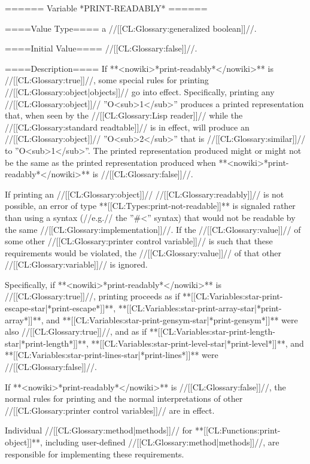 ====== Variable *PRINT-READABLY* ======

====Value Type====
a //[[CL:Glossary:generalized boolean]]//.

====Initial Value====
//[[CL:Glossary:false]]//.

====Description====
If **<nowiki>*print-readably*</nowiki>** is //[[CL:Glossary:true]]//, some special rules for printing //[[CL:Glossary:object|objects]]// go into effect. Specifically, printing any //[[CL:Glossary:object]]// ''O<sub>1</sub>'' produces a printed representation that, when seen by the //[[CL:Glossary:Lisp reader]]// while the //[[CL:Glossary:standard readtable]]// is in effect, will produce an //[[CL:Glossary:object]]// ''O<sub>2</sub>'' that is //[[CL:Glossary:similar]]// to ''O<sub>1</sub>''. The printed representation produced might or might not be the same as the printed representation produced when **<nowiki>*print-readably*</nowiki>** is //[[CL:Glossary:false]]//.

If printing an //[[CL:Glossary:object]]// //[[CL:Glossary:readably]]// is not possible, an error of type **[[CL:Types:print-not-readable]]** is signaled rather than using a syntax (//e.g.// the ''#<'' syntax) that would not be readable by the same //[[CL:Glossary:implementation]]//. If the //[[CL:Glossary:value]]// of some other //[[CL:Glossary:printer control variable]]// is such that these requirements would be violated, the //[[CL:Glossary:value]]// of that other //[[CL:Glossary:variable]]// is ignored.

Specifically, if **<nowiki>*print-readably*</nowiki>** is //[[CL:Glossary:true]]//, printing proceeds as if **[[CL:Variables:star-print-escape-star|*print-escape*]]**, **[[CL:Variables:star-print-array-star|*print-array*]]**, and **[[CL:Variables:star-print-gensym-star|*print-gensym*]]** were also //[[CL:Glossary:true]]//, and as if **[[CL:Variables:star-print-length-star|*print-length*]]**, **[[CL:Variables:star-print-level-star|*print-level*]]**, and **[[CL:Variables:star-print-lines-star|*print-lines*]]** were //[[CL:Glossary:false]]//.

If **<nowiki>*print-readably*</nowiki>** is //[[CL:Glossary:false]]//, the normal rules for printing and the normal interpretations of other //[[CL:Glossary:printer control variables]]// are in effect.

Individual //[[CL:Glossary:method|methods]]// for **[[CL:Functions:print-object]]**, including user-defined //[[CL:Glossary:method|methods]]//, are responsible for implementing these requirements.


